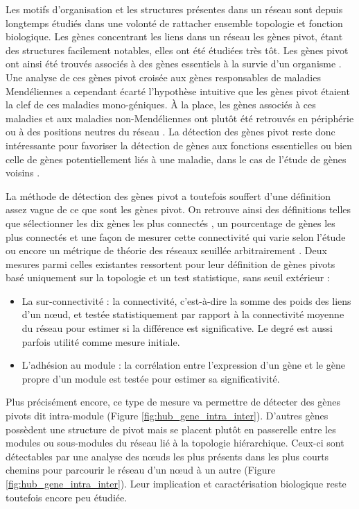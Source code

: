 Les motifs d'organisation et les structures présentes dans un réseau sont depuis longtemps étudiés dans une volonté de rattacher ensemble topologie et fonction biologique. Les gènes concentrant les liens dans un réseau les gènes pivot, étant des structures facilement notables, elles ont été étudiées très tôt. Les gènes pivot ont ainsi été trouvés associés à des gènes essentiels à la survie d'un organisme \cite{Jeong2001May}. Une analyse de ces gènes pivot croisée aux gènes responsables de maladies Mendéliennes a cependant écarté l'hypothèse intuitive que les gènes pivot étaient la clef de ces maladies mono-géniques\cite{Goh2007May}. À la place, les gènes associés à ces maladies et aux maladies non-Mendéliennes ont plutôt été retrouvés en périphérie ou à des positions neutres du réseau \cite{Jeong2001May}. La détection des gènes pivot reste donc intéressante pour favoriser la détection de gènes aux fonctions essentielles ou bien celle de gènes potentiellement liés à une maladie, dans le cas de l'étude de gènes voisins \cite{Langfelder2013}.

La méthode de détection des gènes pivot a toutefois souffert d'une définition assez vague de ce que sont les gènes pivot. On retrouve ainsi des définitions telles que sélectionner les dix gènes les plus connectés \cite{Russo2018}, un pourcentage de gènes les plus connectés et une façon de mesurer cette connectivité qui varie selon l'étude \cite{Sundarrajan2016, Tang2018} ou encore un métrique de théorie des réseaux seuillée arbitrairement \cite{Saha2017}. Deux mesures parmi celles existantes ressortent pour leur définition de gènes pivots basé uniquement sur la topologie et un test statistique, sans seuil extérieur :
\begin{itemize}
    \item La sur-connectivité \cite{Das2017} : la connectivité, c’est-à-dire la somme des poids des liens d'un nœud, et testée statistiquement par rapport à la connectivité moyenne du réseau pour estimer si la différence est significative. Le degré est aussi parfois utilité comme mesure initiale.
    \item L'adhésion au module \cite{Horvath2008} : la corrélation entre l'expression d'un gène et le gène propre d'un module est testée pour estimer sa significativité.
\end{itemize}

Plus précisément encore, ce type de mesure va permettre de détecter des gènes pivots dit intra-module (Figure \ref{fig:hub_gene_intra_inter}). D'autres gènes possèdent une structure de pivot mais se placent plutôt en passerelle entre les modules ou sous-modules du réseau lié à la topologie hiérarchique. Ceux-ci sont détectables par une analyse des nœuds les plus présents dans les plus courts chemins pour parcourir le réseau d'un nœud à un autre (Figure \ref{fig:hub_gene_intra_inter}). Leur implication et caractérisation biologique reste toutefois encore peu étudiée.

